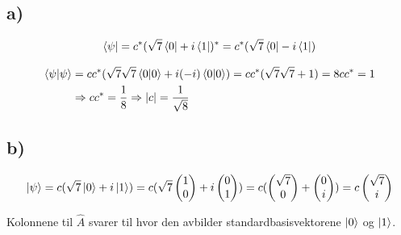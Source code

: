 \documentclass[norsk,a4paper,12pt]{article}
\begin{document}
	\subsection*{a)}
		
		\begin{equation}
		\begin{aligned}
		\bra{\psi} = c^*(\sqrt{7} \bra{0} + i \bra{1})^* = c^*(\sqrt{7} \bra{0} - i \bra{1})
		\end{aligned}
		\end{equation}
		
		\begin{equation}
		\begin{aligned}
		\bra{\psi}\ket{\psi} &= cc^*(\sqrt{7}\sqrt{7} \bra{0}\ket{0} + i(-i) \bra{0}\ket{0})
		= cc^*(\sqrt{7}\sqrt{7} + 1) = 8cc^* = 1 \\
		&\Rightarrow cc^* = \frac{1}{8} \Rightarrow \abs{c} = \frac{1}{\sqrt{8}}
		\end{aligned}
		\end{equation}
	
	\subsection*{b)}
	
		\begin{equation}
		\begin{aligned}
		\ket{\psi} = c(\sqrt{7} \ket{0} + i \ket{1})
		= c(\sqrt{7} \begin{pmatrix}1 \\ 0 \end{pmatrix}  + i \begin{pmatrix}0 \\ 1 \end{pmatrix})
		= c(\begin{pmatrix}\sqrt{7} \\ 0 \end{pmatrix}  + \begin{pmatrix}0 \\ i \end{pmatrix})
		= c\begin{pmatrix}\sqrt{7} \\ i \end{pmatrix}
		\end{aligned}
		\end{equation}
		
		Kolonnene til $\hat{A}$ svarer til hvor den avbilder standardbasisvektorene $\ket{0}$ og $\ket{1}$.
		
\end{document}
